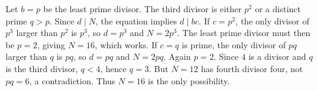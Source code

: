 Let $b=p$ be the least prime divisor. The third divisor is either $p^2$ or a distinct prime $q>p$. Since $d\mid N$, the equation implies $d\mid bc$.
If $c=p^2$, the only divisor of $p^3$ larger than $p^2$ is $p^3$, so $d=p^3$ and $N=2p^3$. The least prime divisor must then be $p=2$, giving $N=16$, which works.
If $c=q$ is prime, the only divisor of $pq$ larger than $q$ is $pq$, so $d=pq$ and $N=2pq$. Again $p=2$. Since $4$ is a divisor and $q$ is the third divisor, $q<4$, hence $q=3$. But $N=12$ has fourth divisor four, not $pq=6$, a contradiction. Thus $\boxed{N=16}$ is the only possibility.
